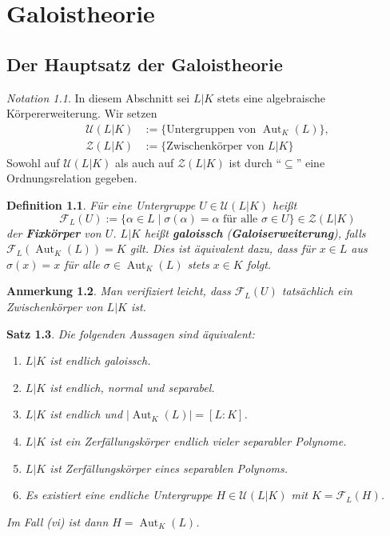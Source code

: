 \documentclass[a4paper, twoside, 11pt, ngerman]{report}
\newcommand{\calF}{\mathcal F}
\newcommand{\calU}{\mathcal U}
\newcommand{\calZ}{\mathcal Z}
\DeclareMathOperator{\Aut}{Aut}
\theoremstyle{definistyle}
\newtheorem{satz}{Satz}[section]
\newtheorem{defini}[satz]{Definition}
\newtheorem{anm}[satz]{Anmerkung}
\theoremstyle{remark}
\newtheorem*{notation}{Notation}
\newcommand{\defn}[1]{\textit{\bfseries #1}}
\begin{document}
\chapter{Galoistheorie}
\setcounter{section}{11}
\section{Der Hauptsatz der Galoistheorie}

\begin{notation}
In diesem Abschnitt sei $L|K$ stets eine algebraische Körpererweiterung. Wir setzen
\begin{align*}
\calU(L|K) & := \{ \text{Untergruppen von }\Aut_K(L)\}, \\
\calZ(L|K) & := \{ \text{Zwischenkörper von } L|K \}
\end{align*}
Sowohl auf $\calU(L|K)$ als auch auf $\calZ(L|K)$ ist durch "`$\subseteq$"' eine Ordnungsrelation gegeben.
\end{notation}

\begin{defini}\label{def:fixkoerper_galoiserw}
Für eine Untergruppe $U\in \calU(L|K)$ heißt 
\[
\calF_L(U) := \{ \alpha \in L \mid \sigma(\alpha) = \alpha \text{ für alle } \sigma \in U \}\in \calZ(L|K)
\]
der \defn{Fixkörper} von $U$.  
$L|K$ heißt \defn{galoissch} (\defn{Galoiserweiterung}), falls $\calF_L(\Aut_K(L)) = K$ gilt. Dies ist äquivalent dazu, dass
für $x\in L$ aus $\sigma(x)=x$ für alle $\sigma\in\Aut_K(L)$ stets $x\in K$ folgt.
\end{defini}

\begin{anm}\label{anm:fixkp_ist_kp}
Man verifiziert leicht, dass $\calF_L(U)$ tatsächlich ein Zwischenkörper von $L|K$ ist. 
\end{anm}

\begin{satz}\label{satz:char_endl_galoissch}
Die folgenden Aussagen sind äquivalent:
\begin{enumerate}
    \item[(i)] $L|K$ ist endlich galoissch.
    \item[(ii)] $L|K$ ist endlich, normal und separabel.
    \item[(iii)] $L|K$ ist endlich und $|\Aut_K(L)| = [L : K]$.
    \item[(iv)] $L|K$ ist ein Zerfällungskörper endlich vieler separabler Polynome.
    \item[(v)] $L|K$ ist Zerfällungskörper eines separablen Polynoms.
    \item[(vi)] Es existiert eine endliche Untergruppe $H \in \calU(L|K)$ mit $K = \calF_L(H)$.  
\end{enumerate}
Im Fall (vi) ist dann $H = \Aut_K(L)$.
\end{satz}
\end{document}

